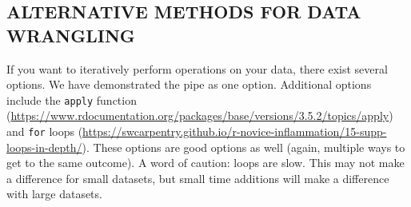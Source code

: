 \documentclass[]{article}
\begin{document}
\subsection{ALTERNATIVE METHODS FOR DATA
WRANGLING}\label{alternative-methods-for-data-wrangling}

If you want to iteratively perform operations on your data, there exist
several options. We have demonstrated the pipe as one option. Additional
options include the \texttt{apply} function
(\url{https://www.rdocumentation.org/packages/base/versions/3.5.2/topics/apply})
and \texttt{for} loops
(\url{https://swcarpentry.github.io/r-novice-inflammation/15-supp-loops-in-depth/}).
These options are good options as well (again, multiple ways to get to
the same outcome). A word of caution: loops are slow. This may not make
a difference for small datasets, but small time additions will make a
difference with large datasets.
\end{document}
